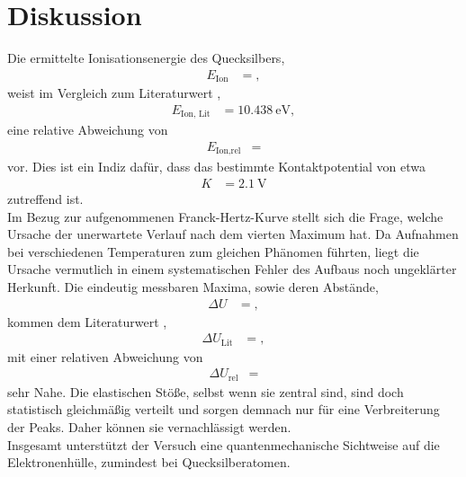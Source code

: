 \section{Diskussion}
\label{sec:Diskussion}

Die ermittelte Ionisationsenergie des Quecksilbers,
\begin{align*}
  E_{\text{Ion}} &= ,
\end{align*}
weist im Vergleich zum Literaturwert \cite{ionisationsenergie},
\begin{align*}
  E_{\text{Ion, Lit}} &= \SI{10.438}{\electronvolt},
\end{align*}
eine relative Abweichung von
\begin{align*}
  E_{\text{Ion,rel}} &= 
\end{align*}
vor.
Dies ist ein Indiz dafür, dass das bestimmte Kontaktpotential von etwa
\begin{align*}
  K &= \SI{2.1}{\volt}
\end{align*}
zutreffend ist.\\
Im Bezug zur aufgenommenen Franck-Hertz-Kurve stellt sich die Frage, welche Ursache der unerwartete Verlauf nach dem vierten Maximum hat.
Da Aufnahmen bei verschiedenen Temperaturen zum gleichen Phänomen führten, liegt die Ursache vermutlich in einem systematischen Fehler des Aufbaus noch ungeklärter Herkunft.
Die eindeutig messbaren Maxima, sowie deren Abstände,
\begin{align*}
  \Delta U &= ,
\end{align*}
kommen dem Literaturwert \cite{anregungsenergie},
\begin{align*}
  \Delta U_{\text{Lit}} &= ,
\end{align*}
mit einer relativen Abweichung von
\begin{align*}
  \Delta U_{\text{rel}} &= 
\end{align*}
sehr Nahe.
Die elastischen Stöße, selbst wenn sie zentral sind, sind doch statistisch gleichmäßig verteilt und sorgen demnach nur für eine Verbreiterung der Peaks.
Daher können sie vernachlässigt werden.\\
Insgesamt unterstützt der Versuch eine quantenmechanische Sichtweise auf die Elektronenhülle, zumindest bei Quecksilberatomen.
